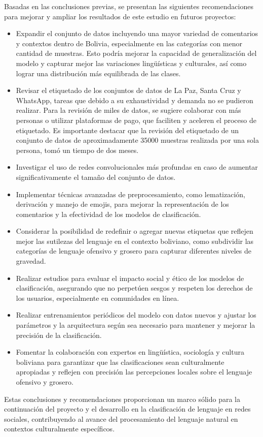Basadas en las conclusiones previas, se presentan las siguientes recomendaciones para mejorar y ampliar los resultados de este estudio en futuros proyectos:

\begin{itemize}

\item Expandir el conjunto de datos incluyendo una mayor variedad de comentarios y contextos dentro de Bolivia, especialmente en las categorías con menor cantidad de muestras. Esto podría mejorar la capacidad de generalización del modelo y capturar mejor las variaciones lingüísticas y culturales, así como lograr una distribución más equilibrada de las clases.

\item Revisar el etiquetado de los conjuntos de datos de La Paz, Santa Cruz y WhatsApp, tareas que debido a su exhaustividad y demanda no se pudieron realizar. Para la revisión de miles de datos, se sugiere colaborar con más personas o utilizar plataformas de pago, que faciliten y aceleren el proceso de etiquetado. Es importante destacar que la revisión del etiquetado de un conjunto de datos de aproximadamente 35000 muestras realizada por una sola persona, tomó un tiempo de dos meses.

\item Investigar el uso de redes convolucionales más profundas en caso de aumentar significativamente el tamaño del conjunto de datos.

\item Implementar técnicas avanzadas de preprocesamiento, como lematización, derivación y manejo de emojis, para mejorar la representación de los comentarios y la efectividad de los modelos de clasificación.

\item Considerar la posibilidad de redefinir o agregar nuevas etiquetas que reflejen mejor las sutilezas del lenguaje en el contexto boliviano, como subdividir las categorías de lenguaje ofensivo y grosero para capturar diferentes niveles de gravedad.

\item Realizar estudios para evaluar el impacto social y ético de los modelos de clasificación, asegurando que no perpetúen sesgos y respeten los derechos de los usuarios, especialmente en comunidades en línea.

\item Realizar entrenamientos periódicos del modelo con datos nuevos y ajustar los parámetros y la arquitectura según sea necesario para mantener y mejorar la precisión de la clasificación.

\item Fomentar la colaboración con expertos en lingüística, sociología y cultura boliviana para garantizar que las clasificaciones sean culturalmente apropiadas y reflejen con precisión las percepciones locales sobre el lenguaje ofensivo y grosero.

\end{itemize}

Estas conclusiones y recomendaciones proporcionan un marco sólido para la continuación del proyecto y el desarrollo en la clasificación de lenguaje en redes sociales, contribuyendo al avance del procesamiento del lenguaje natural en contextos culturalmente específicos.







